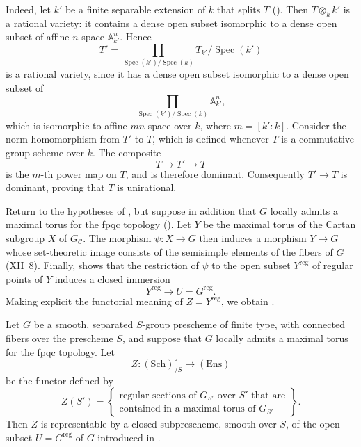 Indeed, let \(k'\) be a finite separable extension of \(k\) that
splits \(T\) (). Then \(T\otimes_k k'\) is a rational
variety: it contains a dense open subset isomorphic to a dense open
subset of affine \(n\)-space \(\mathbb A^n_{k'}\). Hence
\[
  T'
  =
  \prod_{\operatorname{Spec}(k')/\operatorname{Spec}(k)}
  T_{k'}/\operatorname{Spec}(k')
\]
is a rational variety, since it has a dense open subset isomorphic to
a dense open subset of
\[
  \prod_{\operatorname{Spec}(k')/\operatorname{Spec}(k)}
  \mathbb A^n_{k'},
\]
which is isomorphic to affine \(mn\)-space over \(k\), where
\(m=[k':k]\). Consider the norm homomorphism from \(T'\) to \(T\),
which is defined whenever \(T\) is a commutative group scheme over
\(k\). The composite
\[
  T\longrightarrow T'\longrightarrow T
\]
is the \(m\)-th power map on \(T\), and is therefore dominant.
Consequently \(T'\to T\) is dominant, proving that \(T\) is
unirational.

Return to the hypotheses of , but suppose in addition that \(G\)
locally admits a maximal torus for the fpqc topology (). Let
\(Y\) be the maximal torus of the Cartan subgroup \(X\) of
\(G_{\mathcal C}\). The morphism \(\psi:X\to G\) then induces a
morphism \(Y\to G\) whose set-theoretic image consists of the
semisimple elements of the fibers of \(G\) (XII~8). Finally, 
shows that the restriction of \(\psi\) to the open subset
\(Y^{\mathrm{reg}}\) of regular points of \(Y\) induces a closed
immersion
\[
  Y^{\mathrm{reg}}\longrightarrow U=G^{\mathrm{reg}}.
\]
Making explicit the functorial meaning of
\(Z=Y^{\mathrm{reg}}\), we obtain .

\begin{corollary}
Let \(G\) be a smooth, separated \(S\)-group prescheme of finite
type, with connected fibers over the prescheme \(S\), and suppose
that \(G\) locally admits a maximal torus for the fpqc topology. Let
\[
  Z:(\mathrm{Sch})^\circ_{/S}\longrightarrow(\mathrm{Ens})
\]
be the functor defined by
\[
  Z(S')
  =
  \left\{
    \begin{array}{c}
      \text{regular sections of \(G_{S'}\) over \(S'\) that are}\\
      \text{contained in a maximal torus of \(G_{S'}\)}
    \end{array}
  \right\}.
\]
Then \(Z\) is representable by a closed subprescheme, smooth over
\(S\), of the open subset \(U=G^{\mathrm{reg}}\) of \(G\) introduced
in .
\end{corollary}

